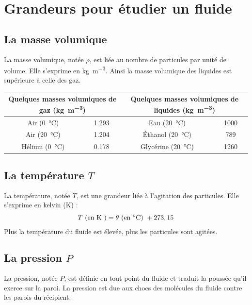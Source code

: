 \documentclass[a4paper,11pt,fleqn]{article}%
\begin{document}
	\maketitle
\section{Grandeurs pour étudier un fluide}
	\subsection{La masse volumique}
	La masse volumique, notée $\rho$, est liée au nombre de particules par unité de volume. Elle s'exprime en \unit{\kilo\gram\per\meter\cubed}. Ainsi la masse volumique des liquides est supérieure à celle des gaz.\\
	\begin{center}
		\begin{tabular}{|c|c|c|c|}
			\hline
			\multicolumn{2}{|c|}{Quelques masses volumiques de gaz (\unit{\kilo\gram\per\meter\cubed})}& \multicolumn{2}{c|}{Quelques masses volumiques de liquides (\unit{\kilo\gram\per\meter\cubed})}\\
			\hline
			Air (\SI{0}{\celsius}) & \num{1,293} & Eau (\SI{20}{\celsius}) & \num{1000}\\
			\hline
			Air (\SI{20}{\celsius}) & \num{1,204} & Éthanol (\SI{20}{\celsius}) & \num{789}\\
			\hline
			Hélium (\SI{0}{\celsius}) & \num{0,178} & Glycérine (\SI{20}{\celsius}) & \num{1260}\\
			\hline
		\end{tabular}
	\end{center}
	
	\subsection{La température $T$}
	La température, notée $T$, est une grandeur liée à l'agitation des particules. Elle s'exprime en kelvin (\unit{\kelvin}) : $$T \text{ (en \unit{\kelvin} )} = \theta \text{ (en \unit{\celsius}) } + 273,15 $$
	Plus la température du fluide est élevée, plus les particules sont agitées.
	
	\subsection{La pression $P$}
	La pression, notée $P$, est définie en tout point du fluide et traduit la poussée qu’il exerce sur la paroi. La pression est due aux chocs des molécules du fluide contre les parois du récipient.
	
\end{document}
